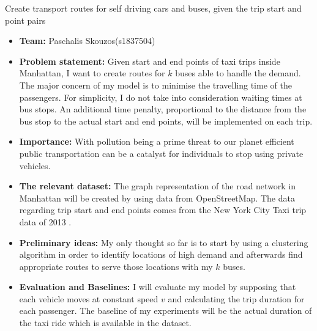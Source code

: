 \documentclass{article}
\title{}
\author{}
\begin{document}
\begin{center}
	\large Create transport routes for self driving cars and buses, given the trip start and point pairs\\ 	
	\hspace{10pt}
\end{center}
\begin{itemize}
	\item \textbf{Team:} Paschalis Skouzos(s1837504) 
	\item \textbf{Problem statement:} Given start and end points of taxi trips inside Manhattan, I want to create routes for $k$ buses able to handle the demand. The major concern of my model is to minimise the travelling time of the passengers. For simplicity, I do not take into consideration waiting times at bus stops. An additional time penalty, proportional to the distance from the bus stop to the actual start and end points, will be implemented on each trip.
	\item \textbf{Importance:} With pollution being a prime threat to our planet efficient public transportation can be a catalyst for individuals to stop using private vehicles.
	\item \textbf{The relevant dataset:} The graph representation of the road network in Manhattan will be created by using data from OpenStreetMap. The data regarding trip start and end points comes from the New York City Taxi trip data of 2013 \citep{donovan_new_2016}.
	\item \textbf{Preliminary ideas:} My only thought so far is to start by using a clustering algorithm in order to identify locations of high demand and afterwards find appropriate routes to serve those locations with my $k$ buses.
	\item \textbf{Evaluation and Baselines:} I will evaluate my model  by supposing that each vehicle moves at constant speed $v$ and calculating the trip duration for each passenger. The baseline of my experiments will be the actual duration of the taxi ride which is available in the dataset.
\end{itemize}


\end{document}
